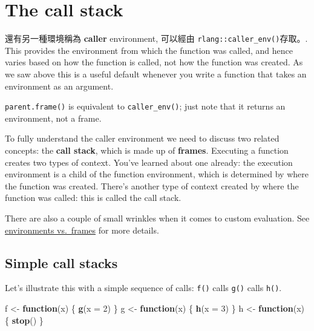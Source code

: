 \documentclass[]{book}
\newenvironment{Shaded}{\begin{snugshade}}{\end{snugshade}}
\newcommand{\ControlFlowTok}[1]{\textcolor[rgb]{0.13,0.29,0.53}{\textbf{#1}}}
\newcommand{\DataTypeTok}[1]{\textcolor[rgb]{0.13,0.29,0.53}{#1}}
\newcommand{\DecValTok}[1]{\textcolor[rgb]{0.00,0.00,0.81}{#1}}
\newcommand{\KeywordTok}[1]{\textcolor[rgb]{0.13,0.29,0.53}{\textbf{#1}}}
\newcommand{\NormalTok}[1]{#1}
\newcommand{\StringTok}[1]{\textcolor[rgb]{0.31,0.60,0.02}{#1}}
\theoremstyle{definition}
\theoremstyle{definition}
\theoremstyle{definition}
\theoremstyle{remark}
\begin{document}
\hypertarget{the-call-stack}{%
\section{The call stack}\label{the-call-stack}}

還有另一種環境稱為 \textbf{caller} environment, 可以經由
\texttt{rlang::caller\_env()}存取。. This provides the environment from
which the function was called, and hence varies based on how the
function is called, not how the function was created. As we saw above
this is a useful default whenever you write a function that takes an
environment as an argument.

\texttt{parent.frame()} is equivalent to \texttt{caller\_env()}; just
note that it returns an environment, not a frame.

To fully understand the caller environment we need to discuss two
related concepts: the \textbf{call stack}, which is made up of
\textbf{frames}. Executing a function creates two types of context.
You've learned about one already: the execution environment is a child
of the function environment, which is determined by where the function
was created. There's another type of context created by where the
function was called: this is called the call stack.

There are also a couple of small wrinkles when it comes to custom
evaluation. See \protect\hyperlink{eval-frame}{environments vs.~frames}
for more details.

\hypertarget{simple-call-stacks}{%
\subsection{Simple call stacks}\label{simple-call-stacks}}

Let's illustrate this with a simple sequence of calls: \texttt{f()}
calls \texttt{g()} calls \texttt{h()}.

\begin{Shaded}
\begin{Highlighting}[]
\NormalTok{f <-}\StringTok{ }\ControlFlowTok{function}\NormalTok{(x) \{}
  \KeywordTok{g}\NormalTok{(}\DataTypeTok{x =} \DecValTok{2}\NormalTok{)}
\NormalTok{\}}
\NormalTok{g <-}\StringTok{ }\ControlFlowTok{function}\NormalTok{(x) \{}
  \KeywordTok{h}\NormalTok{(}\DataTypeTok{x =} \DecValTok{3}\NormalTok{)}
\NormalTok{\}}
\NormalTok{h <-}\StringTok{ }\ControlFlowTok{function}\NormalTok{(x) \{}
  \KeywordTok{stop}\NormalTok{()}
\NormalTok{\}}
\end{Highlighting}
\end{Shaded}
\end{document}
